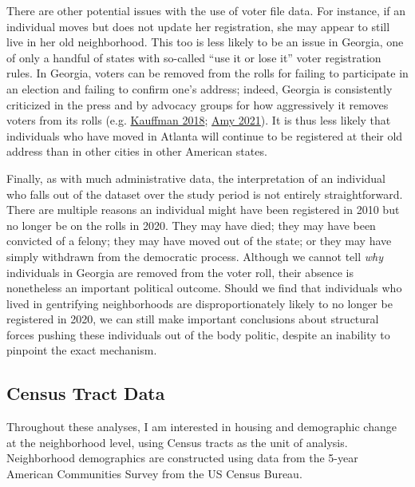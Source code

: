 \documentclass[
  12pt,
]{article}
\begin{document}
There are other potential issues with the use of voter file data. For instance, if an individual moves but does not update her registration, she may appear to still live in her old neighborhood. This too is less likely to be an issue in Georgia, one of only a handful of states with so-called ``use it or lose it'' voter registration rules. In Georgia, voters can be removed from the rolls for failing to participate in an election and failing to confirm one's address; indeed, Georgia is consistently criticized in the press and by advocacy groups for how aggressively it removes voters from its rolls (e.g. \protect\hyperlink{ref-Kauffman2018}{Kauffman 2018}; \protect\hyperlink{ref-Amy2021}{Amy 2021}). It is thus less likely that individuals who have moved in Atlanta will continue to be registered at their old address than in other cities in other American states.

Finally, as with much administrative data, the interpretation of an individual who falls out of the dataset over the study period is not entirely straightforward. There are multiple reasons an individual might have been registered in 2010 but no longer be on the rolls in 2020. They may have died; they may have been convicted of a felony; they may have moved out of the state; or they may have simply withdrawn from the democratic process. Although we cannot tell \emph{why} individuals in Georgia are removed from the voter roll, their absence is nonetheless an important political outcome. Should we find that individuals who lived in gentrifying neighborhoods are disproportionately likely to no longer be registered in 2020, we can still make important conclusions about structural forces pushing these individuals out of the body politic, despite an inability to pinpoint the exact mechanism.

\hypertarget{census-tract-data}{%
\subsection{Census Tract Data}\label{census-tract-data}}

Throughout these analyses, I am interested in housing and demographic change at the neighborhood level, using Census tracts as the unit of analysis. Neighborhood demographics are constructed using data from the 5-year American Communities Survey from the US Census Bureau.
\end{document}
